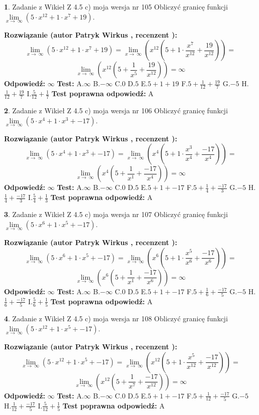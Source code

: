 \documentclass[12pt, a4paper]{article}
\theoremstyle{definition} %
\newtheorem{zad}{}
\newcommand{\zadStart}[1]{\begin{zad}#1\newline}
\newcommand{\zadStop}{\end{zad}}
\newcommand{\rozwStart}[2]{\noindent \textbf{Rozwiązanie (autor #1 , recenzent #2): }\newline}
\newcommand{\rozwStop}{\newline}
\newcommand{\odpStart}{\noindent \textbf{Odpowiedź:}\newline}
\newcommand{\odpStop}{\newline}
\newcommand{\testStart}{\noindent \textbf{Test:}\newline}
\newcommand{\testStop}{\newline}
\newcommand{\kluczStart}{\noindent \textbf{Test poprawna odpowiedź:}\newline}
\newcommand{\kluczStop}{\newline}
\begin{document}
\zadStart{Zadanie z Wikieł Z 4.5 c) moja wersja nr 105}
Obliczyć granicę funkcji  $\lim\limits_{x\to\ \infty}(5 \cdot x^{12}+1 \cdot x^{7}+19)$.
\zadStop
\rozwStart{Patryk Wirkus}{}
$$\lim\limits_{x\to\ \infty}(5 \cdot x^{12}+1 \cdot x^{7}+19) = \lim\limits_{x\to\ \infty}(x^{12}(5 +1 \cdot \frac{x^{7}}{x^{12}}+\frac{19}{x^{12}})) =$$ $$\lim\limits_{x\to\ \infty}(x^{12}(5 +\frac{1}{x^{5}}+\frac{19}{x^{12}})) =\infty$$
\rozwStop
\odpStart
$\infty$
\odpStop
\testStart
A.$\infty$ B.$-\infty$ C.$0$ D.$5$ E.$5 + 1 + 19$
F.$5+\frac{1}{12}+\frac{19}{7}$ G.$-5$
H.$\frac{1}{12}+\frac{19}{7}$
I.$\frac{5}{12}+\frac{1}{7}$
\testStop
\kluczStart
A
\kluczStop



\zadStart{Zadanie z Wikieł Z 4.5 c) moja wersja nr 106}
Obliczyć granicę funkcji  $\lim\limits_{x\to\ \infty}(5 \cdot x^{4}+1 \cdot x^{3}+-17)$.
\zadStop
\rozwStart{Patryk Wirkus}{}
$$\lim\limits_{x\to\ \infty}(5 \cdot x^{4}+1 \cdot x^{3}+-17) = \lim\limits_{x\to\ \infty}(x^{4}(5 +1 \cdot \frac{x^{3}}{x^{4}}+\frac{-17}{x^{4}})) =$$ $$\lim\limits_{x\to\ \infty}(x^{4}(5 +\frac{1}{x^{1}}+\frac{-17}{x^{4}})) =\infty$$
\rozwStop
\odpStart
$\infty$
\odpStop
\testStart
A.$\infty$ B.$-\infty$ C.$0$ D.$5$ E.$5 + 1 + -17$
F.$5+\frac{1}{4}+\frac{-17}{3}$ G.$-5$
H.$\frac{1}{4}+\frac{-17}{3}$
I.$\frac{5}{4}+\frac{1}{3}$
\testStop
\kluczStart
A
\kluczStop



\zadStart{Zadanie z Wikieł Z 4.5 c) moja wersja nr 107}
Obliczyć granicę funkcji  $\lim\limits_{x\to\ \infty}(5 \cdot x^{6}+1 \cdot x^{5}+-17)$.
\zadStop
\rozwStart{Patryk Wirkus}{}
$$\lim\limits_{x\to\ \infty}(5 \cdot x^{6}+1 \cdot x^{5}+-17) = \lim\limits_{x\to\ \infty}(x^{6}(5 +1 \cdot \frac{x^{5}}{x^{6}}+\frac{-17}{x^{6}})) =$$ $$\lim\limits_{x\to\ \infty}(x^{6}(5 +\frac{1}{x^{1}}+\frac{-17}{x^{6}})) =\infty$$
\rozwStop
\odpStart
$\infty$
\odpStop
\testStart
A.$\infty$ B.$-\infty$ C.$0$ D.$5$ E.$5 + 1 + -17$
F.$5+\frac{1}{6}+\frac{-17}{5}$ G.$-5$
H.$\frac{1}{6}+\frac{-17}{5}$
I.$\frac{5}{6}+\frac{1}{5}$
\testStop
\kluczStart
A
\kluczStop



\zadStart{Zadanie z Wikieł Z 4.5 c) moja wersja nr 108}
Obliczyć granicę funkcji  $\lim\limits_{x\to\ \infty}(5 \cdot x^{12}+1 \cdot x^{5}+-17)$.
\zadStop
\rozwStart{Patryk Wirkus}{}
$$\lim\limits_{x\to\ \infty}(5 \cdot x^{12}+1 \cdot x^{5}+-17) = \lim\limits_{x\to\ \infty}(x^{12}(5 +1 \cdot \frac{x^{5}}{x^{12}}+\frac{-17}{x^{12}})) =$$ $$\lim\limits_{x\to\ \infty}(x^{12}(5 +\frac{1}{x^{7}}+\frac{-17}{x^{12}})) =\infty$$
\rozwStop
\odpStart
$\infty$
\odpStop
\testStart
A.$\infty$ B.$-\infty$ C.$0$ D.$5$ E.$5 + 1 + -17$
F.$5+\frac{1}{12}+\frac{-17}{5}$ G.$-5$
H.$\frac{1}{12}+\frac{-17}{5}$
I.$\frac{5}{12}+\frac{1}{5}$
\testStop
\kluczStart
A
\kluczStop
\end{document}
